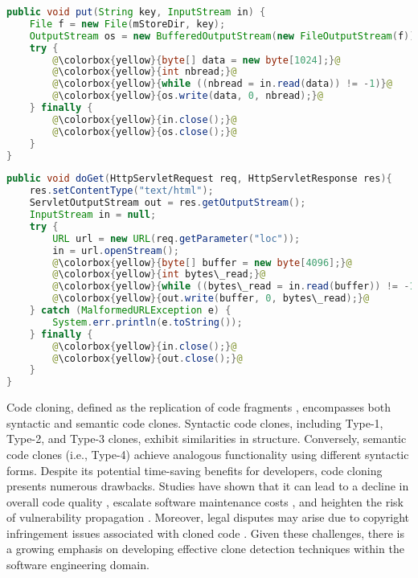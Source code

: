 \begin{figure*}[htbp]
\begin{minipage}[t]{0.5\textwidth}
\begin{lstlisting}[escapechar=@, language=Java]
public void put(String key, InputStream in) {
    File f = new File(mStoreDir, key);
    OutputStream os = new BufferedOutputStream(new FileOutputStream(f));
    try {
        @\colorbox{yellow}{byte[] data = new byte[1024];}@
        @\colorbox{yellow}{int nbread;}@
        @\colorbox{yellow}{while ((nbread = in.read(data)) != -1)}@
        @\colorbox{yellow}{os.write(data, 0, nbread);}@
    } finally {
        @\colorbox{yellow}{in.close();}@
        @\colorbox{yellow}{os.close();}@
    }
}
\end{lstlisting}
\end{minipage}%
\hfill %
\begin{minipage}[t]{0.5\textwidth}
\begin{lstlisting}[escapechar=@, language=Java]
public void doGet(HttpServletRequest req, HttpServletResponse res){
    res.setContentType("text/html");
    ServletOutputStream out = res.getOutputStream();
    InputStream in = null;
    try {
        URL url = new URL(req.getParameter("loc"));
        in = url.openStream();
        @\colorbox{yellow}{byte[] buffer = new byte[4096];}@
        @\colorbox{yellow}{int bytes\_read;}@
        @\colorbox{yellow}{while ((bytes\_read = in.read(buffer)) != -1)}@
        @\colorbox{yellow}{out.write(buffer, 0, bytes\_read);}@
    } catch (MalformedURLException e) {
        System.err.println(e.toString());
    } finally {
        @\colorbox{yellow}{in.close();}@
        @\colorbox{yellow}{out.close();}@
    }
}
\end{lstlisting}
\end{minipage}
\caption{Motivation Example. The core logic is highlighted in yellow.}
\label{fig:motivation}
\end{figure*}

Code cloning, defined as the replication of code fragments \cite{ain2019systematic}, encompasses both syntactic and semantic code clones. 
Syntactic code clones, including Type-1, Type-2, and Type-3 clones, exhibit similarities in structure. 
Conversely, semantic code clones (i.e., Type-4) achieve analogous functionality using different syntactic forms. 
Despite its potential time-saving benefits for developers, code cloning presents numerous drawbacks. 
Studies have shown that it can lead to a decline in overall code quality \cite{kim2005empirical, lavoie2010challenging}, escalate software maintenance costs \cite{mayrand1996experiment}, and heighten the risk of vulnerability propagation \cite{baker1995finding, pham2010detection, li2016clorifi}. 
Moreover, legal disputes may arise due to copyright infringement issues associated with cloned code \cite{xu2023lidetector}. 
Given these challenges, there is a growing emphasis on developing effective clone detection techniques within the software engineering domain.

